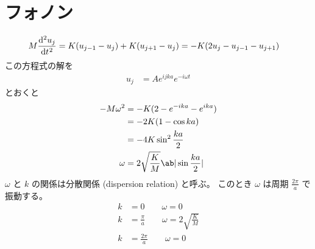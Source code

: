 \documentclass[uplatex,dvipdfmx,a4paper,11pt]{jlreq}
\numberwithin{equation}{section}
\theoremstyle{definition}
\begin{document}
\section{フォノン}
\begin{align}
  M\diff[2]{u_j}{t} & = K(u_{j-1} - u_j) + K(u_{j+1} - u_j) = -K(2u_j - u_{j-1} - u_{j+1})
\end{align}
この方程式の解を
\begin{align}
  u_j & = Ae^{ijka}e^{-i\omega t}
\end{align}
とおくと
\begin{align}
  -M\omega^2 & = -K(2 - e^{-ika} - e^{ika})               \\
             & = -2K(1 - \cos ka)                         \\
             & = -4K\sin^2\frac{ka}{2}                    \\
  \omega     & = 2\sqrt{\frac{K}{M}}\ab|\sin\frac{ka}{2}|
\end{align}
$\omega$ と $k$ の関係は分散関係 (dispersion relation) と呼ぶ。
このとき $\omega$ は周期 $\frac{2\pi}{a}$ で振動する。
\begin{align}
  k & = 0 \qquad \omega = 0                               \\
  k & = \frac{\pi}{a} \qquad \omega = 2\sqrt{\frac{K}{M}} \\
  k & = \frac{2\pi}{a} \qquad \omega = 0
\end{align}
\end{document}
